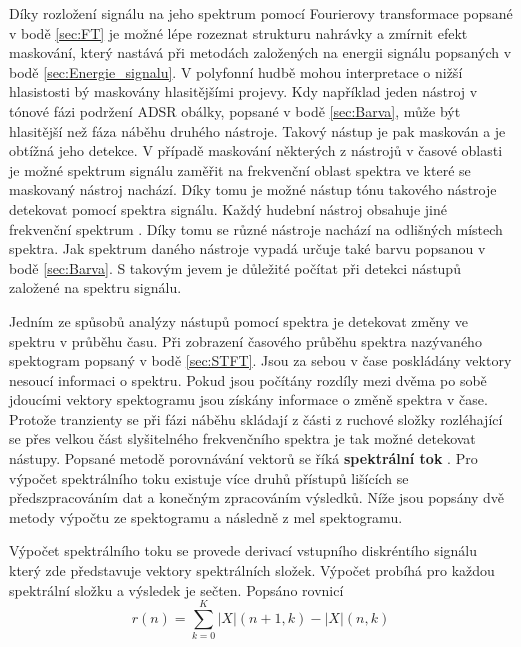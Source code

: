   Díky rozložení signálu na jeho spektrum pomocí Fourierovy transformace popsané v bodě \ref{sec:FT} je možné lépe rozeznat strukturu nahrávky a zmírnit efekt maskování, který nastává při metodách založených na energii signálu popsaných v bodě \ref{sec:Energie_signalu}.
  V polyfonní hudbě mohou interpretace o nižší hlasistosti bý maskovány hlasitějšími projevy.
  Kdy například jeden nástroj v tónové fázi podržení ADSR obálky, popsané v bodě \ref{sec:Barva}, může být hlasitější než fáza náběhu druhého nástroje.
  Takový nástup je pak maskován a je obtížná jeho detekce.
  V případě maskování některých z nástrojů v časové oblasti je možné spektrum signálu zaměřit na frekvenční oblast spektra ve které se maskovaný nástroj nachází.
  Díky tomu je možné nástup tónu takového nástroje detekovat pomocí spektra signálu. Každý hudební nástroj obsahuje jiné frekvenční spektrum \cite{fundamental_of_music_processing}.
  Díky tomu se různé nástroje nachází na odlišných místech spektra. Jak spektrum daného nástroje vypadá určuje také barvu popsanou v bodě \ref{sec:Barva}.
  S takovým jevem je důležité počítat při detekci nástupů založené na spektru signálu. 
 
  Jedním ze spůsobů analýzy nástupů pomocí spektra je detekovat změny ve spektru v průběhu času. Při zobrazení časového průběhu spektra nazývaného spektogram popsaný v bodě \ref{sec:STFT}.
  Jsou za sebou v čase poskládány vektory nesoucí informaci o spektru.
  Pokud jsou počítány rozdíly mezi dvěma po sobě jdoucími vektory spektogramu jsou získány informace o změně spektra v čase.
  Protože tranzienty se při fázi náběhu skládají z části z ruchové složky rozléhající se přes velkou část slyšitelného frekvenčního spektra je tak možné detekovat nástupy.
  Popsané metodě porovnávání vektorů se říká \textbf{spektrální tok} \cite{fundamental_of_music_processing}.
  Pro výpočet spektrálního toku existuje více druhů přístupů lišících se předszpracováním dat a konečným zpracováním výsledků.
  Níže jsou popsány dvě metody výpočtu ze spektogramu a následně z mel spektogramu.

  Výpočet spektrálního toku se provede derivací vstupního diskréntího signálu který zde představuje vektory spektrálních složek. Výpočet probíhá pro každou spektrální složku a výsledek je sečten. Popsáno rovnicí 
\begin{equation}
  r(n) = \sum_{k = 0}^{K} |X|(n+1,k) - |X|(n,k)
\end{equation}


